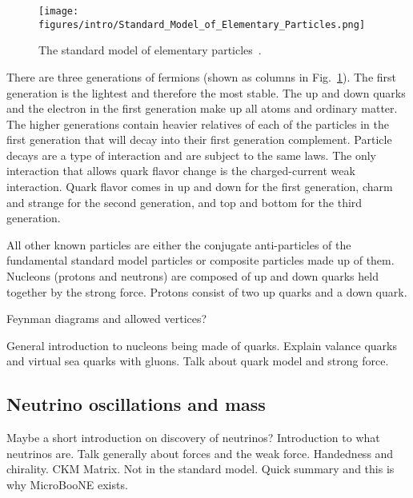   \begin{figure}[ht]
    \centering
    \texttt{[image: figures/intro/Standard\_Model\_of\_Elementary\_Particles.png]}
    \caption{The standard model of elementary particles~\cite{wikipedia}.}
    \label{fig:standardmodel}
  \end{figure}

  There are three generations of fermions (shown as columns in
  Fig.~\ref{fig:standardmodel}). The first generation is the lightest and
  therefore the most stable. The up and down quarks and the electron in the
  first generation make up all atoms and ordinary matter. The higher
  generations contain heavier relatives of each of the particles in the first
  generation that will decay into their first generation complement. Particle
  decays are a type of interaction and are subject to the same laws. The only
  interaction that allows quark flavor change is the charged-current weak
  interaction. Quark flavor comes in up and down for the first generation,
  charm and strange for the second generation, and top and bottom for the third
  generation.

  All other known particles are either the conjugate anti-particles of the
  fundamental standard model particles or composite particles made up of them.
  Nucleons (protons and neutrons) are composed of up and down quarks held
  together by the strong force. Protons consist of two up quarks and a down
  quark.

  Feynman diagrams and allowed vertices?

  General introduction to nucleons being made of quarks. Explain valance quarks
  and virtual sea quarks with gluons.  Talk about quark model and strong force.


\subsection{Neutrino oscillations and mass}\label{sec:bsm}
    Maybe a short introduction on discovery of neutrinos?
    Introduction to what neutrinos are. Talk generally about forces and the
    weak force.  Handedness and chirality. CKM Matrix.
  Not in the standard model. Quick summary and this is why MicroBooNE exists.

